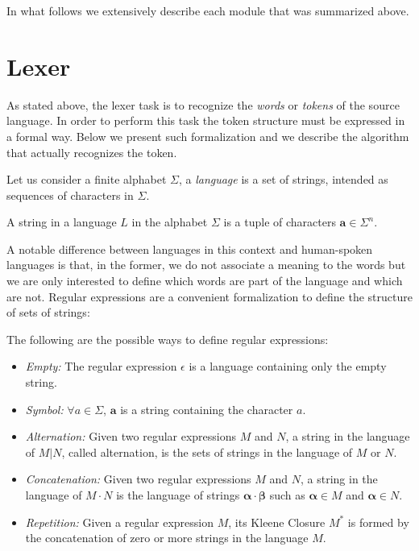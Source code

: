 In what follows we extensively describe each module that was summarized above.

\section{Lexer}
\label{sec:ch_background_compiler_lexer}
As stated above, the lexer task is to recognize the \textit{words} or \textit{tokens} of the source language. In order to perform this task the token structure must be expressed in a formal way. Below we present such formalization and we describe the algorithm that actually recognizes the token.

Let us consider a finite alphabet $\Sigma$, a \textit{language} is a set of strings, intended as sequences of characters in $\Sigma$.

\begin{definition}
	A string in a language $L$ in the alphabet $\Sigma$ is a tuple of characters $\mathbf{a} \in \Sigma^{n}$.
\end{definition}

 A notable difference between  languages in this context and human-spoken languages is that, in the former, we do not associate a meaning to the words but we are only interested to define which words are part of the language and which are not. Regular expressions are a convenient formalization to define the structure of sets of strings:

\begin{definition}
	\label{def:ch_background_regexp}
	 The following are the possible ways to define regular expressions:
	\begin{itemize}[noitemsep]
		\item \textit{Empty:} The regular expression $\epsilon$ is a language containing only the empty string.
		\item \textit{Symbol:} $\forall a \in \Sigma$, $\mathbf{a}$ is a string containing the character $a$.
		\item \textit{Alternation:} Given two regular expressions $M$ and $N$, a string in the language of $M | N$, called alternation, is the sets of strings in the language of $M$ or $N$.
		\item \textit{Concatenation:} Given two regular expressions $M$ and $N$, a string in the language of $M \cdot N$ is the language of strings $\mathbf{\alpha \cdot \beta}$ such as $\mathbf{\alpha} \in M$ and $\mathbf{\alpha} \in N$.
		\item \textit{Repetition:} Given a regular expression $M$, its Kleene Closure $M^{*}$ is formed by the concatenation of zero or more strings in the language $M$.
	\end{itemize}
\end{definition}

